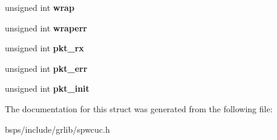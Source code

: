 \begin{DoxyCompactItemize}
\mbox{\label{structspwcuc__stats_a83aae0f36ec3c8e2da3a26798c24fb62}} 
unsigned int {\bfseries wrap}
\item 
\mbox{\label{structspwcuc__stats_a7106c5168e0c4bde12630190dfae036c}} 
unsigned int {\bfseries wraperr}
\item 
\mbox{\label{structspwcuc__stats_a2b7251cdba343c39afbcddf14e2a6168}} 
unsigned int {\bfseries pkt\+\_\+rx}
\item 
\mbox{\label{structspwcuc__stats_ac5ba8fc3f6652df32584f2badcb37510}} 
unsigned int {\bfseries pkt\+\_\+err}
\item 
\mbox{\label{structspwcuc__stats_af64057eceef85ef842500a92840aaedf}} 
unsigned int {\bfseries pkt\+\_\+init}
\end{DoxyCompactItemize}


The documentation for this struct was generated from the following file\+:\begin{DoxyCompactItemize}
\item 
bsps/include/grlib/spwcuc.\+h\end{DoxyCompactItemize}
